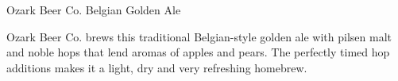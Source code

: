 \begin{recipie}{Ozark Beer Co. Belgian Golden Ale}

\begin{aboutblock}
Ozark Beer Co. brews this traditional Belgian-style golden ale with pilsen malt
and noble hops that lend aromas of apples and pears. The perfectly timed hop
additions makes it a light, dry and very refreshing homebrew.
\end{aboutblock}


\begin{methodandtiming}
 
\begin{mashsteps}
\end{mashsteps}

\begin{fermentationsteps}
\end{fermentationsteps}

\end{methodandtiming}

\pagebreak

\begin{ingredientsblock}

\begin{malts}
\end{malts}

\begin{hops}
\end{hops}

\begin{yeasts}
\end{yeasts}

\end{ingredientsblock}

\end{recipie}